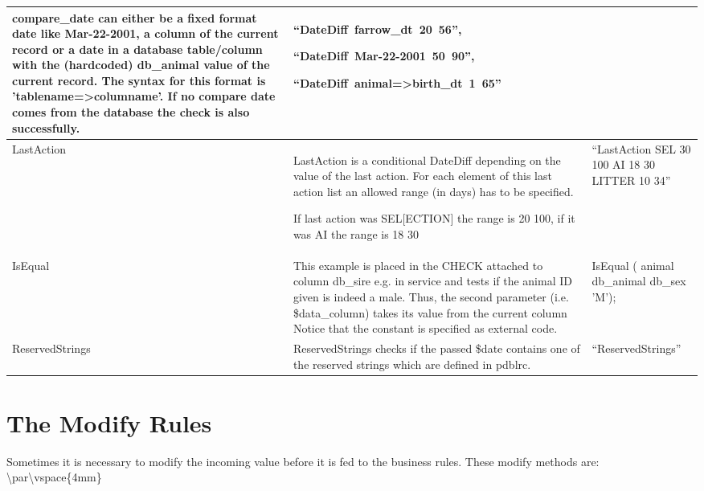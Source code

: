 \begin{table}[htbp]
\begin{center}{\small \vspace*{4mm}}
\begin{sideways}
\begin{tabular}{|l|p{100mm}|p{50mm}|}
{\small compare\_date can either be a fixed format date like Mar-22-2001,
a column of the current record or a date in a database table/column
with the (hardcoded) db\_animal value of the current record. The syntax
for this format is 'tablename=>columname'. If no compare date comes
from the database the check is also successfully. }&
{\small \mbox{{}``DateDiff farrow\_dt 20 56'',}}{\small \par}

{\small \mbox{{}``DateDiff Mar-22-2001 50 90'',}}{\small \par}

{\small \mbox{{}``DateDiff animal=>birth\_dt 1 65''}}\tabularnewline
\hline
{\small LastAction}&
{\small LastAction is a conditional DateDiff depending on the value
of the last action. For each element of this last action list an allowed
range (in days) has to be specified.}{\small \par}

{\small If last action was SEL{[}ECTION{]} the range is 20 100, if
it was AI the range is 18 30}&
{\small {}``LastAction SEL 30 100 AI 18 30 LITTER 10 34''}\tabularnewline
\hline
IsEqual&
This example is placed in the CHECK attached to column db\_sire e.g.
in service and tests if the animal ID given is indeed a male. Thus,
the second parameter (i.e. \$data\_column) takes its value from the
current column Notice that the constant is specified as external code.&
IsEqual ( animal db\_animal db\_sex 'M'); \tabularnewline
\hline
ReservedStrings&
{\small ReservedStrings checks if the passed \$date contains one of
the reserved strings which are defined in pdblrc.}&
{\small {}``ReservedStrings''}\tabularnewline
\hline
\end{tabular}
\end{sideways}\end{center}
\end{table}



\section{The Modify Rules}

Sometimes it is necessary to modify the incoming value before it is
fed to the business rules. These modify methods are: \textbackslash{}par\textbackslash{}vspace\{4mm\}


